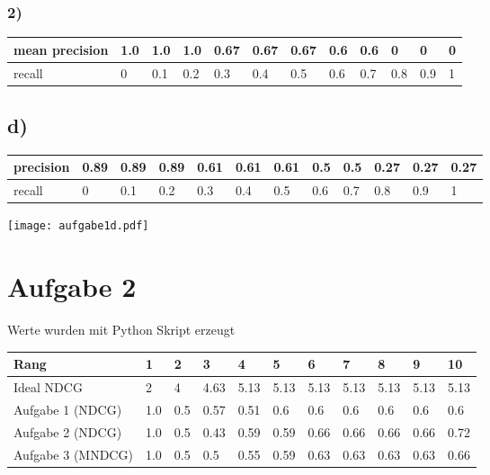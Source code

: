 \documentclass[11pt,a4paper,parskip=half ]{scrartcl}
\begin{document}
	\subsubsection*{2)}
	
	\begin{table}[H]
		\begin{tabular}{|l|l|l|l|l|l|l|l|l|l|l|l|}
			\hline
			mean precision & 1.0 & 1.0 & 1.0 & 0.67 & 0.67 & 0.67 & 0.6 & 0.6 & 0   & 0   & 0 \\ \hline
			recall    & 0   & 0.1 & 0.2 & 0.3  & 0.4  & 0.5  & 0.6 & 0.7 & 0.8 & 0.9 & 1 \\ \hline
		\end{tabular}
	\end{table}
	
	
	\subsection*{d)}
	
	\begin{table}[H]
		\begin{tabular}{|l|l|l|l|l|l|l|l|l|l|l|l|}
			\hline
			precision & 0.89 & 0.89 & 0.89 & 0.61 & 0.61 & 0.61 & 0.5 & 0.5 & 0.27 & 0.27 & 0.27 \\ \hline
			recall    & 0    & 0.1  & 0.2  & 0.3  & 0.4  & 0.5  & 0.6 & 0.7 & 0.8  & 0.9  & 1    \\ \hline
		\end{tabular}
	\end{table}

	\texttt{[image: aufgabe1d.pdf]}
	
	
	\section*{Aufgabe 2}
	Werte wurden mit Python Skript erzeugt
	
	\begin{table}[H]
		\begin{tabular}{|l|l|l|l|l|l|l|l|l|l|l|}
			\hline
			Rang	&	1	&	2	&	3	& 	4	&	5	&	6	&	7	&	8	&	9	&	10	\\
			\hline
			\hline
			Ideal NDCG			&	2	&	4	&	4.63	&	5.13	&	5.13	&	5.13	&	5.13	&	5.13	&	5.13	&	5.13	\\
			\hline
			Aufgabe 1 (NDCG)	&	1.0	&	0.5	&	0.57	&	0.51	&	0.6		&	0.6		&	0.6		&	0.6		&	0.6		&	0.6	\\
			\hline
			Aufgabe 2 (NDCG)	&	1.0	&	0.5	&	0.43	&	0.59	&	0.59	&	0.66	&	0.66	&	0.66	&  0.66 	&  0.72 	\\
			\hline
			Aufgabe 3 (MNDCG)	&	1.0	&	0.5	&	0.5		&	0.55	&	0.59	&	0.63	&	0.63	&	0.63	&	0.63	&	0.66	\\	
			\hline
		\end{tabular}
	\end{table}
	
\end{document}
